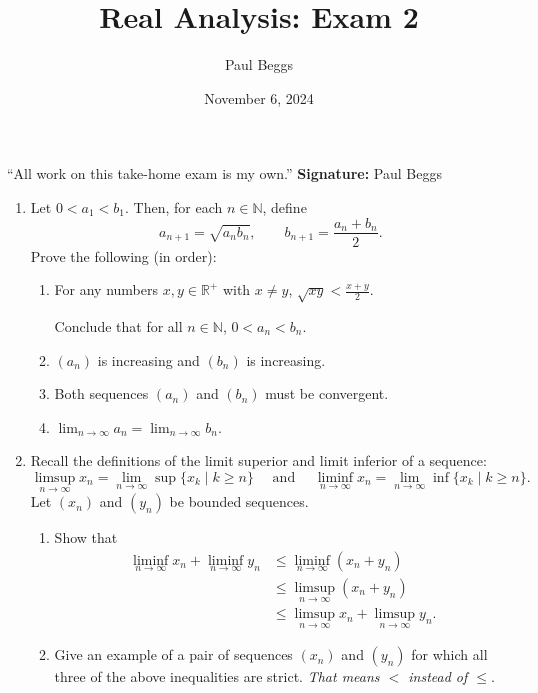 \documentclass[12pt]{article}
\title{Real Analysis: Exam 2}
\author{Paul Beggs}
\date{November 6, 2024}
\newcommand{\limn}[1]{\ensuremath{\lim_{n \rightarrow \infty}}#1}
\newcommand{\limsupn}[1]{\displaystyle\limsup_{n\rightarrow \infty}#1}
\newcommand{\liminfn}[1]{\displaystyle\liminf_{n\rightarrow \infty}#1}
\newcommand{\N}{\ensuremath{\mathbb{N}}}
\newcommand{\R}{\ensuremath{\mathbb{R}}}
\begin{document}
\maketitle

``All work on this take-home exam is my own.'' \hfill \textbf{Signature:} Paul Beggs

\vspace{0.5cm}

\begin{enumerate}
    \item Let \( 0 < a_{1} < b_{1}\). Then, for each \(n \in \N\), define
          \[
              a_{n + 1} = \sqrt{a_{n}b_{n}}, \qquad b_{n + 1} = \frac{a_{n} + b_{n}}{2}.
          \]
          Prove the following (in order):
          \begin{enumerate}
              \item For any numbers \(x,y \in \R^{+}\) with \(x \ne y\), \(\displaystyle \sqrt{xy} < \frac{x + y}{2}\).

                    Conclude that for all \(n \in \N\), \(0 < a_{n} < b_{n}\).
              \item \((a_{n})\) is increasing and \((b_{n})\) is increasing.
              \item Both sequences \((a_{n})\) and \((b_{n})\) must be convergent.
              \item \(\limn{a_{n}} = \limn{b_{n}}\).
          \end{enumerate}
    \item Recall the definitions of the limit superior and limit inferior of a sequence:
          \[
              \limsupn{x_{n}} = \limn{\sup\{x_{k} \mid k \geq n\}} \quad \text{ and }\quad  \liminfn{x_{n}} = \limn{\inf \{x_{k} \mid k \geq n\}}.
          \]
          Let \((x_{n})\) and \((y_{n})\) be bounded sequences.
          \begin{enumerate}
              \item Show that \begin{align*}
                        \liminfn{x_{n}} + \liminfn{y_{n}} & \leq \liminfn{(x_{n} + y_{n})}          \\
                                                          & \leq \limsupn{(x_{n} + y_{n})}          \\
                                                          & \leq \limsupn{x_{n}} + \limsupn{y_{n}}.
                    \end{align*}
              \item Give an example of a pair of sequences \((x_{n})\) and \((y_{n})\) for which all three of the above inequalities are strict. \textit{That means \(<\) instead of \(\leq\)}.
          \end{enumerate}
\end{enumerate}
\end{document}
